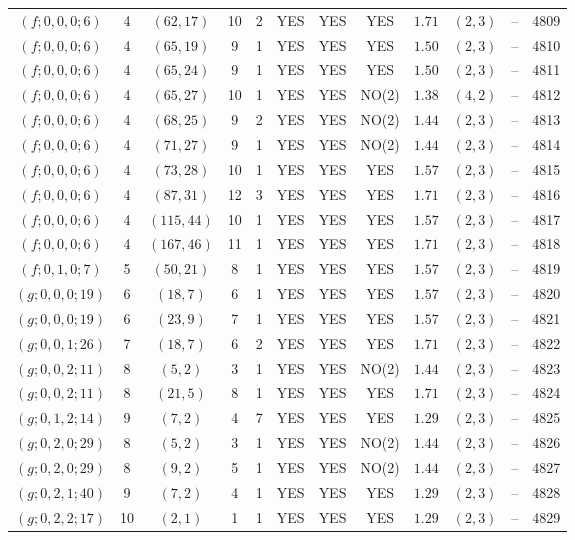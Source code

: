 \begin{longtable}{|c|c|c|c|c|c|c|c|c|c|c|c|}
$(f;0,0,0;6)$ & 4 & $(62,17)$ & 10 & 2 & YES & YES & YES & $1.71$ & $(2,3)$ & -- & 4809\\
$(f;0,0,0;6)$ & 4 & $(65,19)$ & 9 & 1 & YES & YES & YES & $1.50$ & $(2,3)$ & -- & 4810\\
$(f;0,0,0;6)$ & 4 & $(65,24)$ & 9 & 1 & YES & YES & YES & $1.50$ & $(2,3)$ & -- & 4811\\
$(f;0,0,0;6)$ & 4 & $(65,27)$ & 10 & 1 & YES & YES & NO(2) & $1.38$ & $(4,2)$ & -- & 4812\\
$(f;0,0,0;6)$ & 4 & $(68,25)$ & 9 & 2 & YES & YES & NO(2) & $1.44$ & $(2,3)$ & -- & 4813\\
$(f;0,0,0;6)$ & 4 & $(71,27)$ & 9 & 1 & YES & YES & NO(2) & $1.44$ & $(2,3)$ & -- & 4814\\
$(f;0,0,0;6)$ & 4 & $(73,28)$ & 10 & 1 & YES & YES & YES & $1.57$ & $(2,3)$ & -- & 4815\\
$(f;0,0,0;6)$ & 4 & $(87,31)$ & 12 & 3 & YES & YES & YES & $1.71$ & $(2,3)$ & -- & 4816\\
$(f;0,0,0;6)$ & 4 & $(115,44)$ & 10 & 1 & YES & YES & YES & $1.57$ & $(2,3)$ & -- & 4817\\
$(f;0,0,0;6)$ & 4 & $(167,46)$ & 11 & 1 & YES & YES & YES & $1.71$ & $(2,3)$ & -- & 4818\\
$(f;0,1,0;7)$ & 5 & $(50,21)$ & 8 & 1 & YES & YES & YES & $1.57$ & $(2,3)$ & -- & 4819\\
$(g;0,0,0;19)$ & 6 & $(18,7)$ & 6 & 1 & YES & YES & YES & $1.57$ & $(2,3)$ & -- & 4820\\
$(g;0,0,0;19)$ & 6 & $(23,9)$ & 7 & 1 & YES & YES & YES & $1.57$ & $(2,3)$ & -- & 4821\\
$(g;0,0,1;26)$ & 7 & $(18,7)$ & 6 & 2 & YES & YES & YES & $1.71$ & $(2,3)$ & -- & 4822\\
$(g;0,0,2;11)$ & 8 & $(5,2)$ & 3 & 1 & YES & YES & NO(2) & $1.44$ & $(2,3)$ & -- & 4823\\
$(g;0,0,2;11)$ & 8 & $(21,5)$ & 8 & 1 & YES & YES & YES & $1.71$ & $(2,3)$ & -- & 4824\\
$(g;0,1,2;14)$ & 9 & $(7,2)$ & 4 & 7 & YES & YES & YES & $1.29$ & $(2,3)$ & -- & 4825\\
$(g;0,2,0;29)$ & 8 & $(5,2)$ & 3 & 1 & YES & YES & NO(2) & $1.44$ & $(2,3)$ & -- & 4826\\
$(g;0,2,0;29)$ & 8 & $(9,2)$ & 5 & 1 & YES & YES & NO(2) & $1.44$ & $(2,3)$ & -- & 4827\\
$(g;0,2,1;40)$ & 9 & $(7,2)$ & 4 & 1 & YES & YES & YES & $1.29$ & $(2,3)$ & -- & 4828\\
$(g;0,2,2;17)$ & 10 & $(2,1)$ & 1 & 1 & YES & YES & YES & $1.29$ & $(2,3)$ & -- & 4829\\

\end{longtable}
